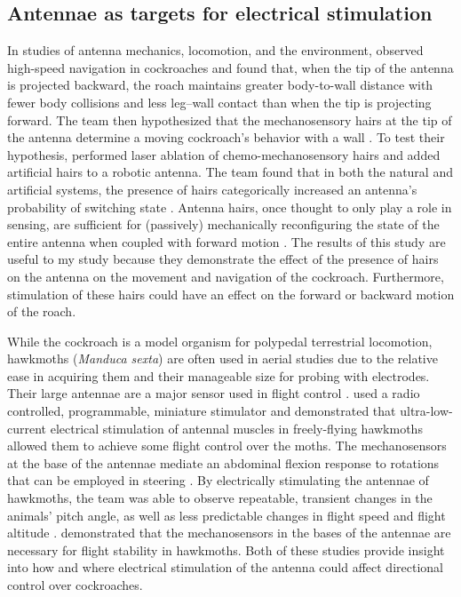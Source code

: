 \documentclass[twocolumn,10pt]{IEEEtran}
\begin{document}
\subsection{Antennae as targets for electrical stimulation}
In studies of antenna mechanics, locomotion, and the environment, \cite{Mongeau2014} observed high-speed navigation in cockroaches and found that, when the tip of the antenna is projected backward, the roach maintains greater body-to-wall distance with fewer body collisions and less leg–wall contact than when the tip is projecting forward. The team then hypothesized that the mechanosensory hairs at the tip of the antenna determine a moving cockroach's behavior with a wall \cite{Mongeau2014}. To test their hypothesis, \cite{Mongeau2014} performed laser ablation of chemo-mechanosensory hairs and added artificial hairs to a robotic antenna. The team found that in both the natural and artificial systems, the presence of hairs categorically increased an antenna’s probability of switching state \cite{Mongeau2014}. Antenna hairs, once thought to only play a role in sensing, are sufficient for (passively) mechanically reconfiguring the state of the entire antenna when coupled with forward motion \cite{Mongeau2014}. The results of this study are useful to my study because they demonstrate the effect of the presence of hairs on the antenna on the movement and navigation of the cockroach. Furthermore, stimulation of these hairs could have an effect on the forward or backward motion of the roach.

While the cockroach is a model organism for polypedal terrestrial locomotion, hawkmoths (\emph{Manduca sexta}) are often used in aerial studies due to the relative ease in acquiring them and their manageable size for probing with electrodes.  Their large antennae are a major sensor used in flight control \cite{antennal}.  \cite{hinterwirth2012wireless} used a radio controlled, programmable, miniature stimulator and demonstrated that ultra-low-current electrical stimulation of antennal muscles in freely-flying hawkmoths allowed them to achieve some flight control over the moths. The mechanosensors at the base of the antennae mediate an abdominal flexion response to rotations that can be employed in steering \cite{hinterwirth2012wireless}. By electrically stimulating the antennae of hawkmoths, the team was able to observe repeatable, transient changes in the animals’ pitch angle, as well as less predictable changes in flight speed and flight altitude \cite{hinterwirth2012wireless}. \cite{antennal} demonstrated that the mechanosensors in the bases of the antennae are necessary for flight stability in hawkmoths. Both of these studies provide insight into how and where electrical stimulation of the antenna could affect directional control over cockroaches.
\end{document}
